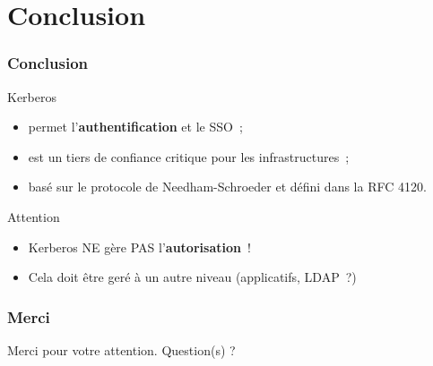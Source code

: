 \documentclass[svgnames]{beamer}
\begin{document}
\section*{Conclusion}
\begin{frame}
  \frametitle{Conclusion}
  
\begin{exampleblock}{Kerberos}
  \begin{itemize}
   \item permet l'\textbf{authentification} et le SSO~;
   \item est un tiers de confiance critique pour les infrastructures~;
   \item basé sur le protocole de Needham-Schroeder et défini dans la RFC 4120. 
   \end{itemize}
 \end{exampleblock}
  
 \begin{alertblock}{Attention}
   \begin{itemize}
    \item Kerberos NE gère PAS l'\textbf{autorisation}~!
    \item Cela doit être geré à un autre niveau (applicatifs, LDAP~?)
   \end{itemize}
  \end{alertblock}

\end{frame}


\begin{frame}
  \frametitle{Merci}
  \begin{center}
    Merci pour votre attention. Question(s) ?
  \end{center}
\end{frame}
\end{document}

